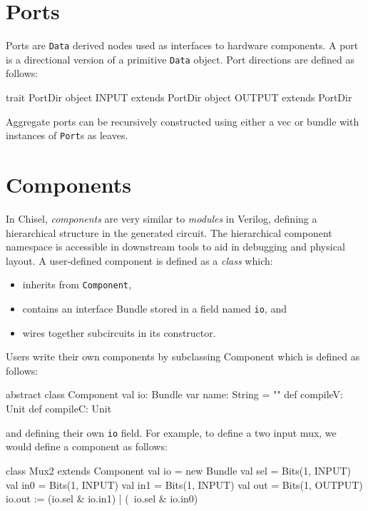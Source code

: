 \documentclass[10pt,twocolumn]{article}
\def\code#1{{\small\tt #1}}
\begin{document}
\section{Ports}
\label{sec:ports}

Ports are \code{Data} derived nodes used as interfaces to hardware
components.   A port is a directional version of a primitive
\code{Data} object.  Port directions are defined as follows:

\begin{scala}
trait PortDir
object INPUT  extends PortDir
object OUTPUT extends PortDir
\end{scala}

\noindent
Aggregate ports can be recursively constructed using either a vec or
bundle with instances of \code{Port}s as leaves.  

\section{Components}

In Chisel, {\em components} are very similar to {\em modules} in
Verilog, defining a hierarchical structure in the generated circuit.
The hierarchical component namespace is accessible in downstream tools
to aid in debugging and physical layout.  A user-defined component is
defined as a {\em class} which:
\begin{itemize}
\item inherits from \code{Component},
\item contains an interface Bundle stored in a field named \code{io}, and
\item wires together subcircuits in its constructor.
\end{itemize}

Users write their own components by subclassing Component which is
defined as follows:

\begin{scala}
abstract class Component {
  val io: Bundle
  var name: String = ""
  def compileV: Unit
  def compileC: Unit
}
\end{scala}

\noindent
and defining their own \code{io} field.  For example, to define a two
input mux, we would define a component as follows:

\begin{scala}
class Mux2 extends Component {
  val io = new Bundle{
    val sel = Bits(1, INPUT)
    val in0 = Bits(1, INPUT)
    val in1 = Bits(1, INPUT)
    val out = Bits(1, OUTPUT)
  }
  io.out := (io.sel & io.in1) | (~io.sel & io.in0)
}
\end{scala}
\end{document}
